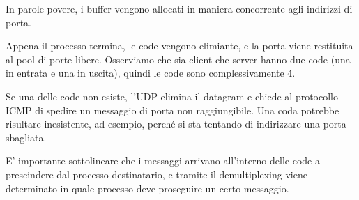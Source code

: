             In parole povere, i buffer vengono allocati in maniera concorrente agli indirizzi di porta.
            
            Appena il processo termina, le code vengono elimiante, e la porta viene restituita al pool di porte libere. Osserviamo che sia client che server hanno due code (una in entrata e una in uscita), quindi le code sono complessivamente 4.
            
            \vspace{3mm}
            
            Se una delle code non esiste, l'UDP elimina il datagram e chiede al protocollo ICMP di spedire un messaggio di porta non raggiungibile. Una coda potrebbe risultare inesistente, ad esempio, perché si sta tentando di indirizzare una porta sbagliata.
             
            E' importante sottolineare che i messaggi arrivano all'interno delle code a prescindere dal processo destinatario, e tramite il demultiplexing viene determinato in quale processo deve proseguire un certo messaggio.